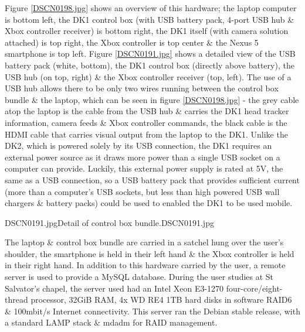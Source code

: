Figure \ref{DSCN0198.jpg} shows an overview of this hardware; the laptop computer is bottom left, the DK1 control box (with USB battery pack, 4-port USB hub \& Xbox controller receiver) is bottom right, the DK1 itself (with camera solution attached) is top right, the Xbox controller is top center \& the Nexus 5 smartphone is top left. Figure \ref{DSCN0191.jpg} shows a detailed view of the USB battery pack (white, bottom), the DK1 control box (directly above battery), the USB hub (on top, right) \& the Xbox controller receiver (top, left). The use of a USB hub allows there to be only two wires running between the control box bundle \& the laptop, which can be seen in figure \ref{DSCN0198.jpg} - the grey cable atop the laptop is the cable from the USB hub \& carries the DK1 head tracker information, camera feeds \& Xbox controller commands, the black cable is the HDMI cable that carries visual output from the laptop to the DK1. Unlike the DK2, which is powered solely by its USB connection, the DK1 requires an external power source as it draws more power than a single USB socket on a computer can provide. Luckily, this external power supply is rated at 5V, the same as a USB connection, so a USB battery pack that provides sufficient current (more than a computer's USB sockets, but less than high powered USB wall chargers \& battery packs) could be used to enabled the DK1 to be used mobile.

       {DSCN0191.jpg}{Detail of control box bundle.}{DSCN0191.jpg}

The laptop \& control box bundle are carried in a satchel hung over the user's shoulder, the smartphone is held in their left hand \& the Xbox controller is held in their right hand. In addition to this hardware carried by the user, a remote server is used to provide a MySQL database. During the user studies at St Salvator's chapel, the server used had an Intel Xeon E3-1270 four-core/eight-thread processor, 32GiB RAM, 4x WD RE4 1TB hard disks in software RAID6 \& 100mbit/s Internet connectivity. This server ran the Debian stable release, with a standard LAMP stack \& mdadm for RAID management.


